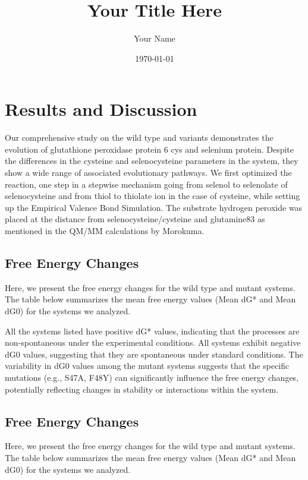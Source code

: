 \documentclass{article}
\begin{document}
\title{Your Title Here}
\author{Your Name}
\date{\today}
\maketitle

\section{Results and Discussion}

Our comprehensive study on the wild type and variants demonstrates the evolution of glutathione peroxidase protein 6 cys and selenium protein. 
Despite the differences in the cysteine and selenocysteine parameters in the system, they show a wide range of associated evolutionary pathways.
We first optimized the reaction, one step in a stepwise mechanism going from selenol to selenolate of selenocysteine and from thiol to thiolate ion in the case of cysteine, while setting up the Empirical Valence Bond Simulation.
The substrate hydrogen peroxide was placed at the distance from selenocysteine/cysteine and glutamine83 as mentioned in the QM/MM calculations by Morokuma.

\subsection{Free Energy Changes}

Here, we present the free energy changes for the wild type and mutant systems. The table below summarizes the mean free energy values (Mean dG* and Mean dG0) for the systems we analyzed.

All the systems listed have positive dG* values, indicating that the processes are non-spontaneous under the experimental conditions.
All systems exhibit negative dG0 values, suggesting that they are spontaneous under standard conditions.
The variability in dG0 values among the mutant systems suggests that the specific mutations (e.g., S47A, F48Y) can significantly influence the free energy changes, potentially reflecting changes in stability or interactions within the system.



\subsection{Free Energy Changes}

Here, we present the free energy changes for the wild type and mutant systems. The table below summarizes the mean free energy values (Mean dG* and Mean dG0) for the systems we analyzed.
\end{document}
